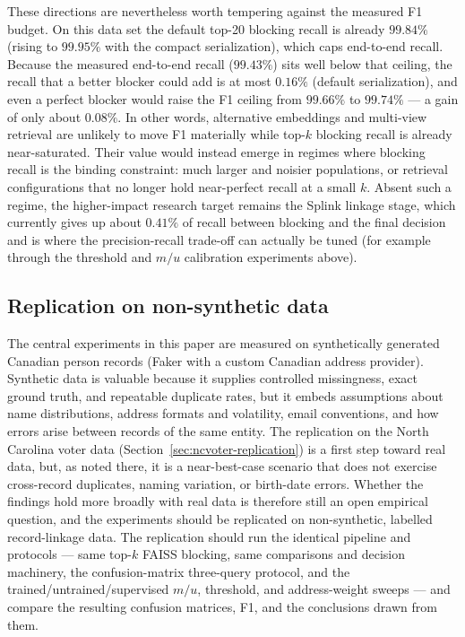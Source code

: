 \documentclass[conference]{IEEEtran}
\begin{document}
These directions are nevertheless worth tempering against the measured F1 budget. On this data set the default top-20 blocking recall is already $99.84\%$ (rising to $99.95\%$ with the compact serialization), which caps end-to-end recall. Because the measured end-to-end recall ($99.43\%$) sits well below that ceiling, the recall that a better blocker could add is at most $0.16\%$ (default serialization), and even a perfect blocker would raise the F1 ceiling from $99.66\%$ to $99.74\%$ --- a gain of only about $0.08\%$. In other words, alternative embeddings and multi-view retrieval are unlikely to move F1 materially while top-$k$ blocking recall is already near-saturated. Their value would instead emerge in regimes where blocking recall is the binding constraint: much larger and noisier populations, or retrieval configurations that no longer hold near-perfect recall at a small $k$. Absent such a regime, the higher-impact research target remains the Splink linkage stage, which currently gives up about $0.41\%$ of recall between blocking and the final decision and is where the precision-recall trade-off can actually be tuned (for example through the threshold and $m/u$ calibration experiments above).

\subsection{Replication on non-synthetic data}
The central experiments in this paper are measured on synthetically generated Canadian person records (Faker with a custom Canadian address provider). Synthetic data is valuable because it supplies controlled missingness, exact ground truth, and repeatable duplicate rates, but it embeds assumptions about name distributions, address formats and volatility, email conventions, and how errors arise between records of the same entity. The replication on the North Carolina voter data (Section~\ref{sec:ncvoter-replication}) is a first step toward real data, but, as noted there, it is a near-best-case scenario that does not exercise cross-record duplicates, naming variation, or birth-date errors. Whether the findings hold more broadly with real data is therefore still an open empirical question, and the experiments should be replicated on non-synthetic, labelled record-linkage data. The replication should run the identical pipeline and protocols --- same top-$k$ FAISS blocking, same comparisons and decision machinery, the confusion-matrix three-query protocol, and the trained/untrained/supervised $m/u$, threshold, and address-weight sweeps --- and compare the resulting confusion matrices, F1, and the conclusions drawn from them.
\end{document}
